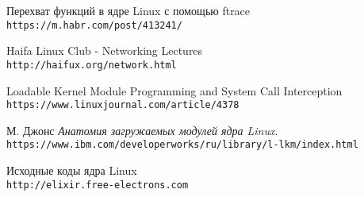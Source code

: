 %


\begin{thebibliography}{9}
	Перехват функций в ядре Linux с помощью ftrace
	\\\texttt{https://m.habr.com/post/413241/}
	
	Haifa Linux Club - Networking Lectures
	\\\texttt{http://haifux.org/network.html}
	
	Loadable Kernel Module Programming and System Call Interception
	\\\texttt{https://www.linuxjournal.com/article/4378}
	
	М. Джонс 
	\textit{Анатомия загружаемых модулей ядра Linux}.
	\\\texttt{https://www.ibm.com/developerworks/ru/library/l-lkm/index.html}
	
	Исходные коды ядра Linux
	\\\texttt{http://elixir.free-electrons.com}
\end{thebibliography}


